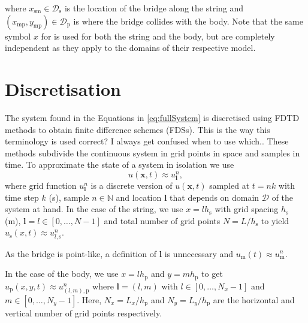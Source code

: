 \documentclass[dvipsnames, pdftex]{article}
\def\SWcomment[#1]{\textcolor{Bittersweet}{#1}}
\def\MDcomment[#1]{\textcolor{Blue}{#1}}
\begin{document}
where $x_\text{sm} \in \mathcal{D}_\text{s}$ is the location of the bridge along the string and $(x_\text{mp}, y_\text{mp}) \in \mathcal{D}_\text{p}$ is where the bridge collides with the body. Note that the same symbol $x$ for is used for both the string and the body, but are completely independent as they apply to the domains of their respective model. %

\section{Discretisation}\label{sec:disc}
The system found in the Equations in \eqref{eq:fullSystem} is discretised using FDTD methods to obtain finite difference schemes (FDSs). \SWcomment[This is the way this terminology is used correct? I always get confused when to use which..]{} These methods subdivide the continuous system in grid points in space and samples in time. To approximate the state of a system in isolation we use
\begin{equation}\label{eq:generalDisc}
    u(\boldsymbol{x},t) \approx u^n_{\boldsymbol{l}}, 
\end{equation} 
where grid function $u^n_{\boldsymbol{l}}$ is a discrete version of $u({\boldsymbol{x}},t)$ sampled at $t=nk$ with time step $k$ (s), sample $n \in \mathbb{N}$ and location $\boldsymbol{l}$ that depends on domain $\mathcal{D}$ of the system at hand. In the case of the string, we use $x=lh_\text{s}$ with grid spacing $h_\text{s}$ (m), $\boldsymbol{l} = l \in [0,\hdots, N-1]$ and total number of grid points $N=L/h_\text{s}$ to yield $u_\text{s}(x,t) \approx u_{l,\text{s}}^n$. 

As the bridge is point-like, a definition of $\boldsymbol{l}$ is unnecessary and $u_\text{m}(t) \approx u_\text{m}^n$. 

In the case of the body, we use $x=lh_\text{p}$ and $y=mh_\text{p}$ to get $u_\text{p}(x, y, t) \approx u_{(l,m),\text{p}}^n$ where $\boldsymbol{l} = (l,m)$ with $l\in[0,\hdots,N_x-1]$ and $m\in[0,\hdots,N_y-1]$. Here, $N_x = L_x / h_\text{p}$ and $N_y = L_y / h_\text{p}$ are the horizontal and vertical number of grid points respectively.
\end{document}

